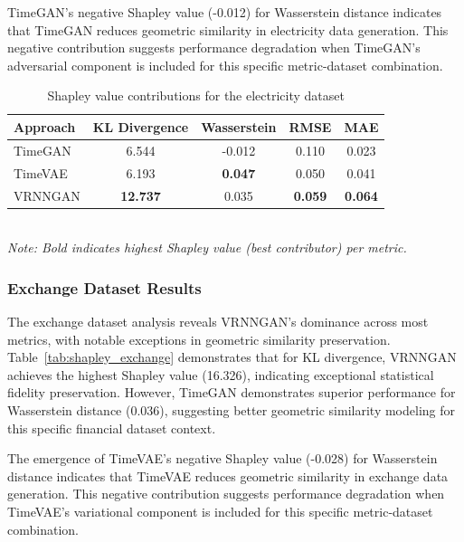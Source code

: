\documentclass{article}
\begin{document}
TimeGAN's negative Shapley value (-0.012) for Wasserstein distance indicates that TimeGAN reduces geometric similarity in electricity data generation. This negative contribution suggests performance degradation when TimeGAN's adversarial component is included for this specific metric-dataset combination.

\begin{table}[H]
\centering
\caption{Shapley value contributions for the electricity dataset}
\label{tab:shapley_electricity}
\begin{tabular}{lcccc}
\toprule
\textbf{Approach} & \textbf{KL Divergence} & \textbf{Wasserstein} & \textbf{RMSE} & \textbf{MAE} \\
\midrule
TimeGAN & 6.544 & -0.012 & 0.110 & 0.023 \\
TimeVAE & 6.193 & \textbf{0.047} & 0.050 & 0.041 \\
VRNNGAN & \textbf{12.737} & 0.035 & \textbf{0.059} & \textbf{0.064} \\
\bottomrule
\end{tabular}
\\[0.5em]
\footnotesize
\textit{Note: Bold indicates highest Shapley value (best contributor) per metric.}
\end{table}

\subsubsection{Exchange Dataset Results}
The exchange dataset analysis reveals VRNNGAN's dominance across most metrics, with notable exceptions in geometric similarity preservation. Table~\ref{tab:shapley_exchange} demonstrates that for KL divergence, VRNNGAN achieves the highest Shapley value (16.326), indicating exceptional statistical fidelity preservation. However, TimeGAN demonstrates superior performance for Wasserstein distance (0.036), suggesting better geometric similarity modeling for this specific financial dataset context.

The emergence of TimeVAE's negative Shapley value (-0.028) for Wasserstein distance indicates that TimeVAE reduces geometric similarity in exchange data generation. This negative contribution suggests performance degradation when TimeVAE's variational component is included for this specific metric-dataset combination.
\end{document}
